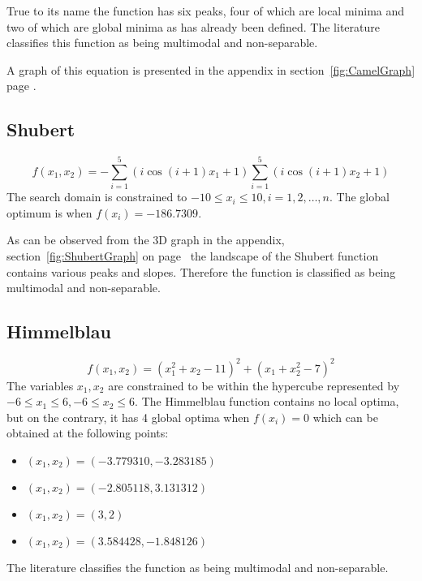 True to its name the function has six peaks, four of which are local minima and two of which are global minima as has already been defined. The literature classifies this function as being multimodal and non-separable\cite{ABCCompareStudy,TestFunctions}.

A graph of this equation is presented in the appendix in section~\ref{fig:CamelGraph} page \pageref{fig:CamelGraph}.
\subsection{Shubert}
\begin{equation}
	f(x_1,x_2) = -\sum_{i = 1}^5 (i\cos{(i +1)x_1 + 1})\sum_{i=1}^5 (i\cos{(i+1)x_2 + 1})
\end{equation}
The search domain is constrained to $-10 \leq x_i \leq 10, i = 1,2, \ldots, n$\cite{ABCCompareStudy,TSGlobalOptimization,ContinACSTS,TestFunctions}. The global optimum is when $f(x_i) = -186.7309$\cite{ABCCompareStudy,TSGlobalOptimization,ContinACSTS,TestFunctions}. 

As can be observed from the 3D graph in the appendix, section~\ref{fig:ShubertGraph} on page~\pageref{fig:ShubertGraph} the landscape of the Shubert function contains various peaks and slopes. Therefore the function is classified as being multimodal and non-separable\cite{ABCCompareStudy,TestFunctions}.

\subsection{Himmelblau}
\begin{equation}
	f(x_1,x_2) = (x_1^2 + x_2 - 11)^2 + (x_1 + x_2^2 - 7)^2
\end{equation}
The variables $x_1,x_2$ are constrained to be within the hypercube represented by $-6 \leq x_1 \leq 6, -6 \leq x_2 \leq 6$\cite{TestFunctions,ABCCompareStudy}. The Himmelblau function contains no local optima, but on the contrary, it has 4 global optima when $f(x_i) = 0$ which can be obtained at the following points\cite{TestFunctions,ABCCompareStudy}:
\begin{itemize}
\item $(x_1,x_2) = (-3.779310,-3.283185)$
\item $(x_1,x_2) = (-2.805118,3.131312)$
\item $(x_1,x_2) = (3,2)$
\item $(x_1,x_2) = (3.584428,-1.848126)$
\end{itemize}
The literature classifies the function as being multimodal and non-separable\cite{TestFunctions,ABCCompareStudy}.

